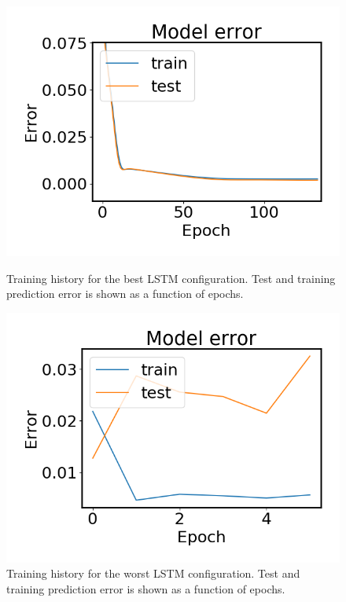                 \begin{figure}
                    \begin{minipage}[b]{0.49\linewidth}
                        \centering
                        \includegraphics[width = \textwidth]{report/figures/analysis/lstm_gridsearch/best_lstm_error_zoomed.png}
                        \caption{Training history for the best LSTM configuration. Test and training prediction error is shown as a function of epochs.}
                        \label{fig:lstm_grid_error_best}
                    \end{minipage}
                    \hfill\vline\hfill
                    \begin{minipage}[b]{0.49\linewidth}
                        \centering
                        \includegraphics[width = \textwidth]{report/figures/analysis/lstm_gridsearch/worst_lstm_error_-1.png}
                        \caption{Training history for the worst LSTM configuration. Test and training prediction error is shown as a function of epochs.}
                        \label{fig:lstm_grid_error_worst}
                    \end{minipage}
                \end{figure}
        
